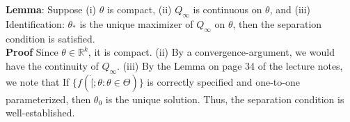 \documentclass[11pt]{article}
\theoremstyle{definition}
\theoremstyle{boldtitle} %
\numberwithin{equation}{section}
\numberwithin{figure}{section}
\numberwithin{table}{section}
\begin{document}
\textbf{Lemma}: Suppose (i) $\theta$ is compact, (ii) $Q_\infty$ is continuous on $\theta$, 
and (iii) Identification: $\theta_*$ is the unique maximizer of $Q_\infty$ on $\theta$,
then the separation condition is satisfied. 
\\
\textbf{Proof} Since $\theta \in \mathbb{R}^k$, it is compact. 
(ii) By a convergence-argument, we would have the continuity of $Q_\infty$.
(iii) By the Lemma on page 34 of the lecture notes, we note that 
If $\{f(\dot | \dot; \theta: \theta \in \Theta)\}$ is correctly specified and one-to-one parameterized,
then $\theta_0$ is the unique solution.
Thus, the separation condition is well-established.




\end{document}

